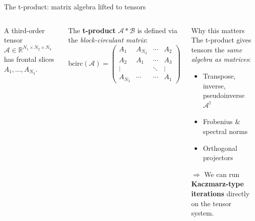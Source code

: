 \documentclass[aspectratio=169,10pt]{beamer}
\def\fm#1{\mathcal{#1}}
\newcommand{\bcirc}{\mathrm{bcirc}}
\begin{document}
\begin{frame}{The t-product: matrix algebra lifted to tensors}

  \begin{columns}[T]
      A third-order tensor $\fm{A} \in \mathbb{R}^{N_1 \times N_2 \times N_3}$
      has frontal slices $A_1, \ldots, A_{N_3}$.

      \medskip
      The \textbf{t-product} $\fm{A} * \fm{B}$ is defined via the
      \emph{block-circulant matrix}:
      \[
        \bcirc(\fm{A}) =
        \begin{pmatrix}
          A_1 & A_{N_3} & \cdots & A_2 \\
          A_2 & A_1     & \cdots & A_3 \\
          \vdots & & \ddots & \vdots \\
          A_{N_3} & \cdots & \cdots & A_1
        \end{pmatrix}
      \]

      \begin{alertblock}{Why this matters}
        The t-product gives tensors the \emph{same algebra as matrices}:
        \begin{itemize}
          \item Transpose, inverse, pseudoinverse $\fm{A}^\dagger$
          \item Frobenius \& spectral norms
          \item Orthogonal projectors
        \end{itemize}
        $\Rightarrow$ We can run \textbf{Kaczmarz-type iterations} directly
        on the tensor system.
      \end{alertblock}
  \end{columns}

\end{frame}
\end{document}

